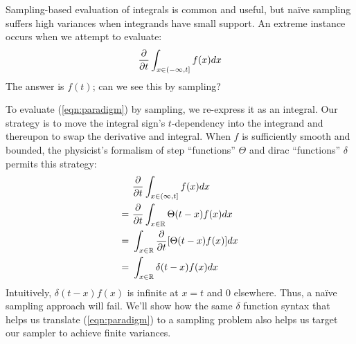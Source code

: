     Sampling-based evaluation of integrals is common and useful, but na\"ive
    sampling suffers high variances when integrands have small support.  An 
    extreme instance occurs when we attempt to evaluate:
    \begin{equation}\label{eqn:paradigm}
        \frac{\partial }{\partial t} \int_{x\in (-\infty,t]} f(x) dx 
    \end{equation}
    The answer is $f(t)$; can we see this by sampling?

    To evaluate (\ref{eqn:paradigm}) by sampling, we re-express it as an
    integral.  Our strategy is to move the integral sign's $t$-dependency into
    the integrand and thereupon to swap the derivative and integral.  
    When $f$ is sufficiently smooth and bounded, the physicist's formalism of
    step ``functions'' $\Theta$ and dirac
    ``functions'' $\delta$ permits this strategy:
    \begin{align*}
        &~\frac{\partial }{\partial t} \int_{x\in (\infty,t]} f(x) dx 
        \\=
        &~\frac{\partial }{\partial t} \int_{x\in {\mathbb R}}
            \Theta(t-x) f(x) dx 
        \\=
        &~\int_{x\in {\mathbb R}} \frac{\partial }{\partial t}
            [\Theta(t-x) f(x)] dx 
        \\=
        &~\int_{x\in {\mathbb R}} 
            \delta(t-x) f(x) dx 
    \end{align*}
    Intuitively, $\delta(t-x) f(x)$ is infinite at $x=t$ and $0$ elsewhere.
    Thus, a na\"ive sampling approach will fail.  We'll show how the same
    $\delta$ function syntax that helps us translate (\ref{eqn:paradigm}) to a
    sampling problem also helps us target our sampler to achieve finite
    variances.
